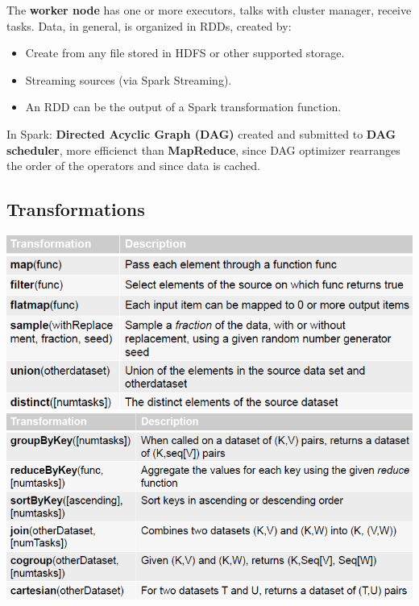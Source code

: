 \documentclass{article}
\begin{document}
The \textbf{worker node} has one or more executors, talks with cluster manager, receive tasks. Data, in general, is organized in RDDs, created by:\\
\begin{itemize}
\item Create from any file stored in HDFS or other supported storage.
\item Streaming sources (via Spark Streaming).
\item An RDD can be the output of a Spark transformation function.
\end{itemize}
In Spark: \textbf{Directed Acyclic Graph (DAG) }created and submitted to \textbf{DAG scheduler}, more efficienct than \textbf{MapReduce}, since DAG optimizer rearranges the order of the operators and since data is cached.
\subsection{Transformations}
\includegraphics[scale=0.6]{44.png}
\includegraphics[scale=0.6]{45.png}\\\\
\end{document}
